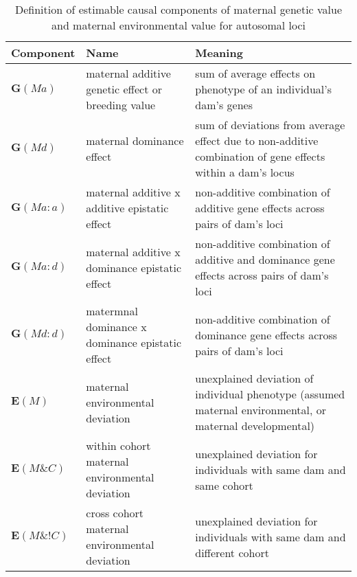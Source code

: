 \begin{table}[h]
\centering
\caption{Definition of estimable causal components of maternal genetic value and maternal environmental value for autosomal loci}
\label{tab.mat}
\vspace{0.1in}
\begin{tabular}{l|p{1.2in}|p{2.4in}}
Component & Name & Meaning \\ \hline
${\bm G(Ma)}$     & maternal additive genetic effect or breeding value &  sum of average effects on phenotype of an individual's dam's genes \\
${\bm G(Md)}$     & maternal dominance effect  & sum of deviations from average effect due to non-additive combination of gene effects within a dam's locus \\
${\bm G(Ma:a)}$   & maternal additive x additive epistatic effect & non-additive combination of additive gene effects across pairs of dam's loci \\
${\bm G(Ma:d)}$   & maternal additive x dominance epistatic effect & non-additive combination of additive and dominance gene effects across pairs of dam's loci \\
${\bm G(Md:d)}$   & matermnal dominance x dominance epistatic effect & non-additive combination of dominance gene effects across pairs of dam's loci\\ \hline
${\bm E(M)}$      & maternal environmental deviation & unexplained deviation of individual phenotype (assumed maternal environmental, or maternal developmental) \\
${\bm E(M\&C)}$    & within cohort maternal environmental deviation & unexplained deviation for individuals with same dam and same cohort \\
${\bm E(M\&!C)}$   & cross cohort maternal environmental deviation & unexplained deviation for individuals with same dam and different cohort \\   \hline
\end{tabular}
\end{table}
